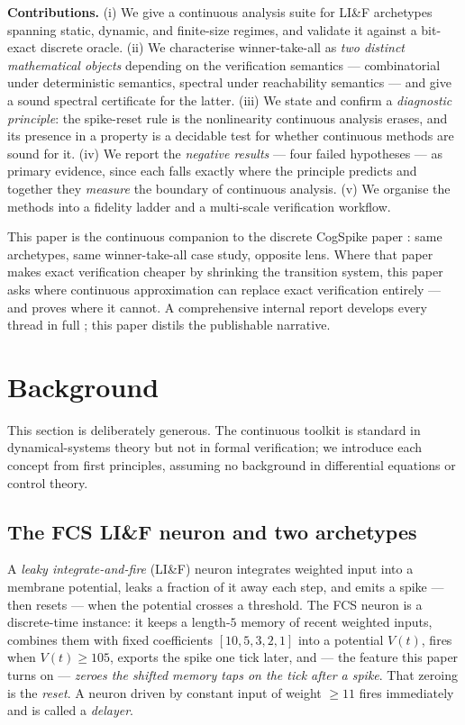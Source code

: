 \documentclass[conference]{IEEEtran}
\begin{document}
\textbf{Contributions.} (i) We give a continuous analysis suite for LI\&F
archetypes spanning static, dynamic, and finite-size regimes, and validate it
against a bit-exact discrete oracle. (ii) We characterise winner-take-all as
\emph{two distinct mathematical objects} depending on the verification
semantics --- combinatorial under deterministic semantics, spectral under
reachability semantics --- and give a sound spectral certificate for the
latter. (iii) We state and confirm a \emph{diagnostic principle}: the
spike-reset rule is the nonlinearity continuous analysis erases, and its
presence in a property is a decidable test for whether continuous methods are
sound for it. (iv) We report the \emph{negative results} --- four failed
hypotheses --- as primary evidence, since each falls exactly where the
principle predicts and together they \emph{measure} the boundary of continuous
analysis. (v) We organise the methods into a fidelity ladder and a multi-scale
verification workflow.

This paper is the continuous companion to the discrete CogSpike paper
\cite{cogspike_wd}: same archetypes, same winner-take-all case study, opposite
lens. Where that paper makes exact verification cheaper by shrinking the
transition system, this paper asks where continuous approximation can replace
exact verification entirely --- and proves where it cannot. A comprehensive
internal report develops every thread in full \cite{synthesis}; this paper
distils the publishable narrative.

\section{Background}\label{sec:background}

This section is deliberately generous. The continuous toolkit is standard in
dynamical-systems theory but not in formal verification; we introduce each
concept from first principles, assuming no background in differential equations
or control theory.

\subsection{The FCS LI\&F neuron and two archetypes}\label{sec:fcs}

A \emph{leaky integrate-and-fire} (LI\&F) neuron integrates weighted input into
a membrane potential, leaks a fraction of it away each step, and emits a spike
--- then resets --- when the potential crosses a threshold. The FCS neuron
\cite{DeMaria2020} is a discrete-time instance: it keeps a length-$5$ memory of
recent weighted inputs, combines them with fixed coefficients $[10,5,3,2,1]$
into a potential $V(t)$, fires when $V(t) \geq 105$, exports the spike one tick
later, and --- the feature this paper turns on --- \emph{zeroes the shifted
memory taps on the tick after a spike}. That zeroing is the \emph{reset}. A
neuron driven by constant input of weight $\geq 11$ fires immediately and is
called a \emph{delayer}.
\end{document}

